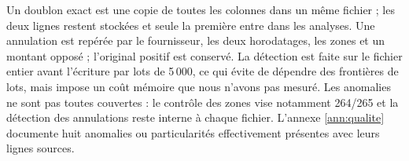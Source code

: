 Un doublon exact est une copie de toutes les colonnes dans un même fichier ;
les deux lignes restent stockées et seule la première entre dans les analyses. Une annulation est repérée par
le fournisseur, les deux horodatages, les zones et un montant opposé ; l'original
positif est conservé. La détection est faite sur le fichier entier avant l'écriture
par lots de 5\,000, ce qui évite de dépendre des frontières de lots, mais impose
un coût mémoire que nous n'avons pas mesuré. Les anomalies ne sont pas toutes
couvertes : le contrôle des zones vise notamment 264/265 et la détection des
annulations reste interne à chaque fichier. L'annexe \ref{ann:qualite} documente
huit anomalies ou particularités effectivement présentes avec leurs lignes sources.
